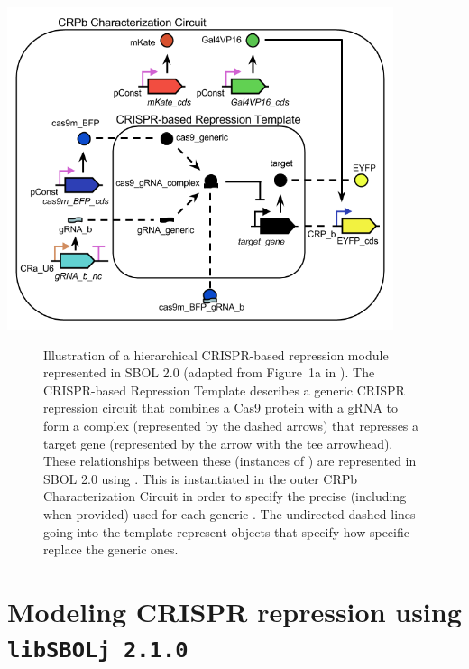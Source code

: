 \begin{center}
  \includegraphics[width=0.85\textwidth]{figures/crispr_repression2} 
\end{center}

\begin{figure}[tbph]
\caption{\label{fig:fig-CRPb} Illustration of a hierarchical CRISPR-based repression module represented in SBOL 2.0 (adapted from Figure~1a in \cite{kiani2014crispr}). The CRISPR-based Repression Template  describes a generic CRISPR repression circuit that combines a Cas9 protein with a gRNA to form a complex (represented by the dashed arrows) that represses a target gene (represented by the arrow with the tee arrowhead).  These relationships between these  (instances of ) are represented in SBOL 2.0 using .  This  is instantiated in the outer CRPb Characterization Circuit  in order to specify the precise (including  when provided)   used for each generic . The undirected dashed lines going into the template  represent  objects that specify how specific  replace the generic ones.}
\end{figure}
\newpage
\section*{Modeling CRISPR repression using {\tt libSBOLj 2.1.0}}

